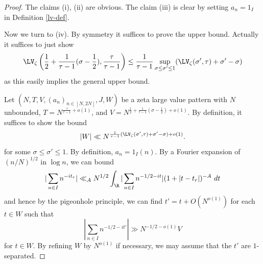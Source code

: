 \begin{proof}  The claims (i), (ii) are obvious.  The claim (iii) is clear by setting $a_n = 1_I$ in Definition \ref{lv-def}.

    Now we turn to (iv).  By symmetry it suffices to prove the upper bound.  Actually it suffices to just show
    $$ \LV_\zeta\left(\frac{1}{2} + \frac{1}{\tau-1} (\sigma-\frac{1}{2}), \frac{\tau}{\tau-1}\right) \leq \frac{1}{\tau-1} \sup_{\sigma \leq \sigma' \leq 1} (\LV_\zeta(\sigma',\tau) + \sigma'-\sigma)$$
    as this easily implies the general upper bound.

    Let $(N,T,V,(a_n)_{n \in [N,2N]},J,W)$ be a zeta large value pattern with
    $N$ unbounded, $T= N^{\frac{\tau}{\tau-1}+o(1)}$, and $V = N^{\frac{1}{2} + \frac{1}{\tau-1} (\sigma-\frac{1}{2})+o(1)}$. By definition, it suffices to show the bound
    \begin{equation}\label{r-targ}
        |W| \ll N^{\frac{1}{\tau-1} (\LV_\zeta(\sigma',\tau) + \sigma'-\sigma)+o(1)}.
    \end{equation}
    for some $\sigma \leq \sigma' \leq 1$.
    By definition, $a_n = 1_I(n)$. By a Fourier expansion of $(n/N)^{1/2}$ in $\log n$, we can bound
    $$ |\sum_{n \in I} n^{-it_r}| \ll_A N^{1/2} \int_\R |\sum_{n \in I} n^{-1/2-it}| (1 + |t-t_r|)^{-A}\ dt$$
    and hence by the pigeonhole principle, we can find $t' = t + O(N^{o(1)})$ for each $t \in W$ such that
    $$ |\sum_{n \in I} n^{-1/2-it'}| \gg N^{-1/2-o(1)} V$$
    for $t \in W$.  By refining $W$ by $N^{o(1)}$ if necessary, we may assume that the $t'$ are $1$-separated.


\end{proof}
